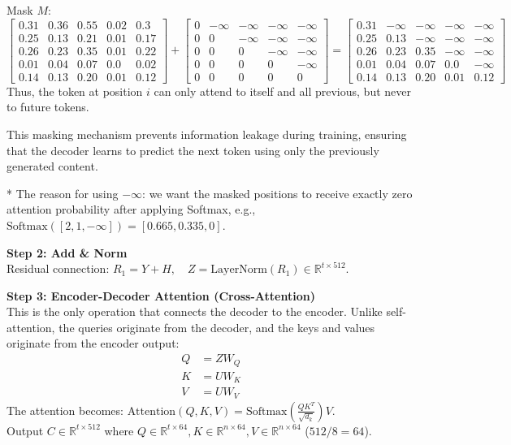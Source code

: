 Mask $M$:
\begin{equation}
\begin{bmatrix}
0.31 & 0.36 & 0.55 & 0.02 & 0.3 \\
0.25 & 0.13 & 0.21 & 0.01 & 0.17 \\
0.26 & 0.23 & 0.35 & 0.01 & 0.22 \\
0.01 & 0.04 & 0.07 & 0.0 & 0.02 \\
0.14 & 0.13 & 0.20 & 0.01 & 0.12
\end{bmatrix}
+
\begin{bmatrix}
0 & -\infty & -\infty & -\infty & -\infty \\
0 & 0 & -\infty & -\infty & -\infty \\
0 & 0 & 0 & -\infty & -\infty \\
0 & 0 & 0 & 0 & -\infty \\
0 & 0 & 0 & 0 & 0
\end{bmatrix}
=
\begin{bmatrix}
0.31 & -\infty & -\infty & -\infty & -\infty \\
0.25 & 0.13 & -\infty & -\infty & -\infty \\
0.26 & 0.23 & 0.35 & -\infty & -\infty \\
0.01 & 0.04 & 0.07 & 0.0 & -\infty \\
0.14 & 0.13 & 0.20 & 0.01 & 0.12
\end{bmatrix}
\end{equation}
Thus, the token at position $i$ can only attend to itself and all previous, but never to future tokens.

This masking mechanism prevents information leakage during training, ensuring that the decoder learns to predict the next token using only the previously generated content.

* The reason for using $-\infty$: we want the masked positions to receive exactly zero attention probability after applying Softmax, e.g., $\text{Softmax}([2, 1, -\infty]) = [0.665, 0.335, 0]$.

\textbf{Step 2: Add \& Norm} \\
Residual connection: $R_1 = Y + H, \quad Z = \text{LayerNorm}(R_1) \in \mathbb{R}^{t \times 512}$.

\textbf{Step 3: Encoder-Decoder Attention (Cross-Attention)} \\
This is the only operation that connects the decoder to the encoder. Unlike self-attention, the queries originate from the decoder, and the keys and values originate from the encoder output:
\begin{align}
Q &= Z W_Q \\
K &= U W_K \\
V &= U W_V
\end{align}
The attention becomes: $\text{Attention}(Q, K, V) = \text{Softmax}\left(\frac{Q K^T}{\sqrt{d_k}}\right) V$. \\
Output $C \in \mathbb{R}^{t \times 512}$ where $Q \in \mathbb{R}^{t \times 64}, K \in \mathbb{R}^{n \times 64}, V \in \mathbb{R}^{n \times 64}$ ($512/8 = 64$).

